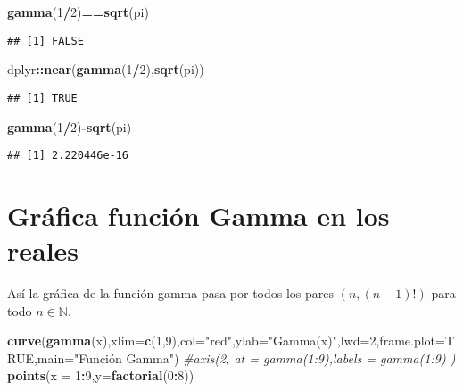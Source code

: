 \documentclass[
]{article}
\newenvironment{Shaded}{\begin{snugshade}}{\end{snugshade}}
\newcommand{\AttributeTok}[1]{\textcolor[rgb]{0.13,0.29,0.53}{#1}}
\newcommand{\CommentTok}[1]{\textcolor[rgb]{0.56,0.35,0.01}{\textit{#1}}}
\newcommand{\ConstantTok}[1]{\textcolor[rgb]{0.56,0.35,0.01}{#1}}
\newcommand{\DecValTok}[1]{\textcolor[rgb]{0.00,0.00,0.81}{#1}}
\newcommand{\FunctionTok}[1]{\textcolor[rgb]{0.13,0.29,0.53}{\textbf{#1}}}
\newcommand{\NormalTok}[1]{#1}
\newcommand{\SpecialCharTok}[1]{\textcolor[rgb]{0.81,0.36,0.00}{\textbf{#1}}}
\newcommand{\StringTok}[1]{\textcolor[rgb]{0.31,0.60,0.02}{#1}}
\begin{document}
\begin{Shaded}
\begin{Highlighting}[]
\FunctionTok{gamma}\NormalTok{(}\DecValTok{1}\SpecialCharTok{/}\DecValTok{2}\NormalTok{)}\SpecialCharTok{==}\FunctionTok{sqrt}\NormalTok{(pi)}
\end{Highlighting}
\end{Shaded}

\begin{verbatim}
## [1] FALSE
\end{verbatim}

\begin{Shaded}
\begin{Highlighting}[]
\NormalTok{dplyr}\SpecialCharTok{::}\FunctionTok{near}\NormalTok{(}\FunctionTok{gamma}\NormalTok{(}\DecValTok{1}\SpecialCharTok{/}\DecValTok{2}\NormalTok{),}\FunctionTok{sqrt}\NormalTok{(pi))}
\end{Highlighting}
\end{Shaded}

\begin{verbatim}
## [1] TRUE
\end{verbatim}

\begin{Shaded}
\begin{Highlighting}[]
\FunctionTok{gamma}\NormalTok{(}\DecValTok{1}\SpecialCharTok{/}\DecValTok{2}\NormalTok{)}\SpecialCharTok{{-}}\FunctionTok{sqrt}\NormalTok{(pi)}
\end{Highlighting}
\end{Shaded}

\begin{verbatim}
## [1] 2.220446e-16
\end{verbatim}

\hypertarget{gruxe1fica-funciuxf3n-gamma-en-los-reales}{%
\section{Gráfica función Gamma en los
reales}\label{gruxe1fica-funciuxf3n-gamma-en-los-reales}}

Así la gráfica de la función gamma pasa por todos los pares
\((n,(n-1)!)\) para todo \(n \in \mathbb{N}.\)

\begin{Shaded}
\begin{Highlighting}[]
\FunctionTok{curve}\NormalTok{(}\FunctionTok{gamma}\NormalTok{(x),}\AttributeTok{xlim=}\FunctionTok{c}\NormalTok{(}\DecValTok{1}\NormalTok{,}\DecValTok{9}\NormalTok{),}\AttributeTok{col=}\StringTok{"red"}\NormalTok{,}\AttributeTok{ylab=}\StringTok{"Gamma(x)"}\NormalTok{,}\AttributeTok{lwd=}\DecValTok{2}\NormalTok{,}\AttributeTok{frame.plot=}\ConstantTok{TRUE}\NormalTok{,}\AttributeTok{main=}\StringTok{"Función Gamma"}\NormalTok{)}
\CommentTok{\#axis(2, at = gamma(1:9),labels = gamma(1:9) )}
\FunctionTok{points}\NormalTok{(}\AttributeTok{x =} \DecValTok{1}\SpecialCharTok{:}\DecValTok{9}\NormalTok{,}\AttributeTok{y=}\FunctionTok{factorial}\NormalTok{(}\DecValTok{0}\SpecialCharTok{:}\DecValTok{8}\NormalTok{))}
\end{Highlighting}
\end{Shaded}
\end{document}

